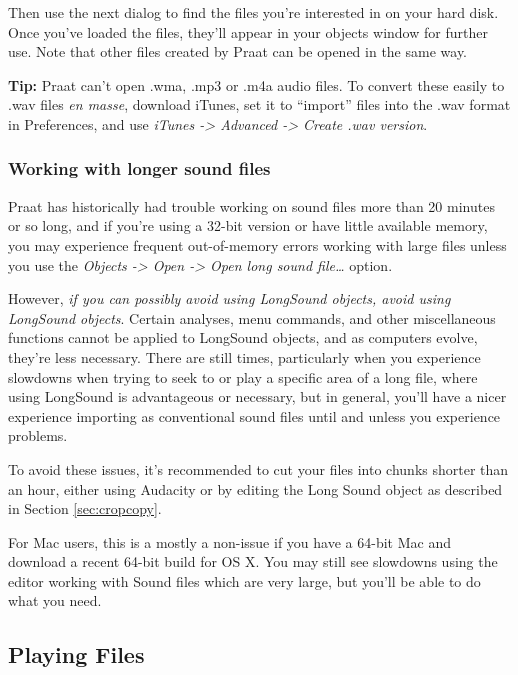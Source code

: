 \documentclass[11pt]{article}
\begin{document}
Then use the next dialog to find the files you're interested in on your
hard disk. Once you've loaded the files, they'll appear in your objects
window for further use. Note that other files created by Praat can be
opened in the same way.

\textbf{Tip:} Praat can't open .wma, .mp3 or .m4a audio files. To
convert these easily to .wav files \emph{en masse}, download iTunes, set
it to ``import'' files into the .wav format in Preferences, and use
\emph{iTunes -\textgreater{} Advanced -\textgreater{} Create .wav
version}.

\hypertarget{working-with-longer-sound-files}{%
\subsubsection{Working with longer sound
files}\label{working-with-longer-sound-files}}

\label{longsounds}

Praat has historically had trouble working on sound files more than 20
minutes or so long, and if you're using a 32-bit version or have little
available memory, you may experience frequent out-of-memory errors
working with large files unless you use the \emph{Objects
-\textgreater{} Open -\textgreater{} Open long sound file\ldots{}}
option.

However, \emph{if you can possibly avoid using LongSound objects, avoid
using LongSound objects}. Certain analyses, menu commands, and other
miscellaneous functions cannot be applied to LongSound objects, and as
computers evolve, they're less necessary. There are still times,
particularly when you experience slowdowns when trying to seek to or
play a specific area of a long file, where using LongSound is
advantageous or necessary, but in general, you'll have a nicer
experience importing as conventional sound files until and unless you
experience problems.

To avoid these issues, it's recommended to cut your files into chunks
shorter than an hour, either using Audacity or by editing the Long Sound
object as described in Section \ref{sec:cropcopy}.

For Mac users, this is a mostly a non-issue if you have a 64-bit Mac and
download a recent 64-bit build for OS X. You may still see slowdowns
using the editor working with Sound files which are very large, but
you'll be able to do what you need.

\hypertarget{playing-files}{%
\subsection{Playing Files}\label{playing-files}}
\end{document}
